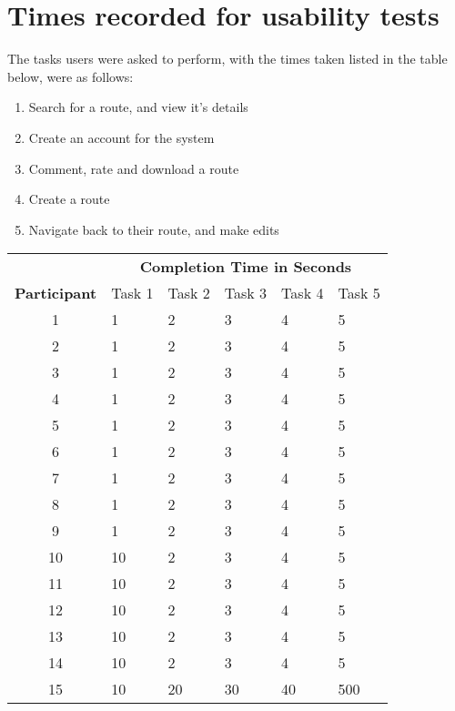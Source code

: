 \section{Times recorded for usability tests}
\label{sec:trfut}

The tasks users were asked to perform, with the times taken listed in the table below, were as follows:
\begin{enumerate}
	\item Search for a route, and view it's details
	\item Create an account for the system
	\item Comment, rate and download a route 
	\item Create a route
	\item Navigate back to their route, and make edits
\end{enumerate}

\begin{center}
	\begin{tabular}{c|lllll}
		& \multicolumn{5}{c}{\textbf{Completion Time in Seconds}} \\
		\cline{2-6}
		\textbf{Participant}  & Task 1 & Task 2 & Task 3 & Task 4 & Task 5 \\
		\hline 
		1 	&1 		  & 2 & 3 & 4 & 5\\
		2 	&1	   	  & 2 & 3 & 4 & 5\\
		3 	&1 		  & 2 & 3 & 4 & 5\\
		4 	&1 	 	  & 2 & 3 & 4 & 5\\
		5 	&1  	  & 2 & 3 & 4 & 5\\
		6 	&1	 	  & 2 & 3 & 4 & 5\\
		7 	&1 		  & 2 & 3 & 4 & 5\\
		8 	&1 		  & 2 & 3 & 4 & 5\\
		9 	&1 		  & 2 & 3 & 4 & 5\\
		10 &10		& 2 & 3 & 4 & 5\\
		11 &10 		& 2 & 3 & 4 & 5\\
		12 &10 		& 2 & 3 & 4 & 5\\
		13 &10 		& 2 & 3 & 4 & 5\\
		14 &10 		& 2 & 3 & 4 & 5\\
		15 &10 		& 20 & 30 & 40 & 500\\
		\hline 
	\end{tabular}	
\end{center}
